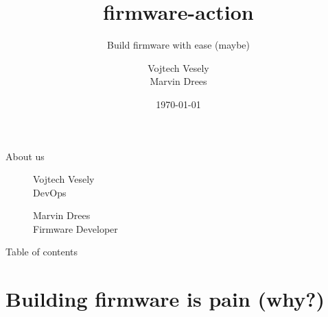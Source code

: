 \documentclass{beamer}
\title{firmware-action}
\subtitle{Build firmware with ease (maybe)}
\author{Vojtech Vesely\texorpdfstring{\\}{,}Marvin Drees}
\date{\today}
\begin{document}

\begin{frame}
	\maketitle %
\end{frame}



\begin{frame}{About us}
	\begin{figure}
	\centering
	\begin{minipage}{.5\textwidth}
		\Large{Vojtech Vesely}\\
		\small{DevOps}
	\end{minipage}%
	\begin{minipage}{.5\textwidth}
		\Large{Marvin Drees}\\
		\small{Firmware Developer}
	\end{minipage}
	\end{figure}
\end{frame}



\begin{frame}{Table of contents}
	\tableofcontents[hideallsubsections]
\end{frame}



\section{Building firmware is pain (why?)}
\end{document}
